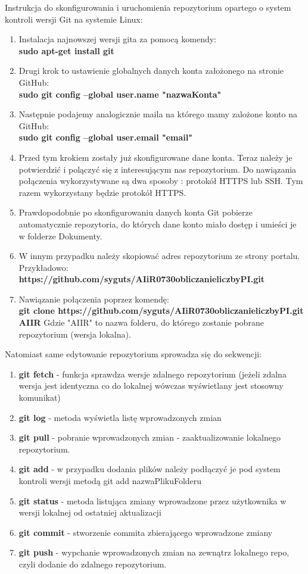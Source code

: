 \documentclass[a4paper,12pt]{article}		%
\begin{document}
Instrukcja do skonfigurowania i uruchomienia repozytorium opartego o system kontroli wersji Git na systemie Linux:
\begin{enumerate}
\item Instalacja najnowszej wersji gita za pomocą komendy:\\
\textbf{sudo apt-get install git}
\item Drugi krok to ustawienie globalnych danych konta założonego na stronie GitHub:\\
\textbf{sudo git config --global user.name "nazwaKonta" }
\item Następnie podajemy analogicznie maila na którego mamy zalożone konto na GitHub:\\
\textbf{sudo git config --global user.email "email"}
\item Przed tym krokiem zostały już skonfigurowane dane konta.  Teraz należy je potwierdzić i polączyć się z interesującym nas repozytorium. Do nawiązania połączenia wykorzystywane są dwa sposoby : protokół HTTPS lub SSH. Tym razem wykorzystany będzie protokół HTTPS.
\item Prawdopodobnie po skonfigurowaniu danych konta Git pobierze automatycznie repozytoria, do których dane konto miało dostęp i umieści je w folderze Dokumenty.
\item W innym przypadku należy skopiować adres repozytorium ze strony portalu. Przykładowo:\\
\textbf{https://github.com/syguts/AIiR0730obliczanieliczbyPI.git}
\item Nawiązanie połączenia poprzez komendę:\\
\textbf{git clone https://github.com/syguts/AIiR0730obliczanieliczbyPI.git AIIR}
Gdzie "AIIR" to nazwa folderu, do którego zostanie pobrane repozytorium (wersja lokalna).
\end{enumerate}
Natomiast same edytowanie repozytorium sprowadza się do sekwencji:\\
\begin{enumerate}
\item \textbf{git fetch} - funkcja sprawdza wersje zdalnego repozytorium (jeżeli zdalna wersja jest identyczna co do lokalnej wówczas wyświetlany jest stosowny komunikat)
\item \textbf{git log} - metoda wyświetla listę wprowadzonych zmian
\item \textbf{git pull} - pobranie wprowadzonych zmian - zaaktualizowanie lokalnego repozytorium.
\item \textbf{git add} -  w przypadku dodania plików należy podłączyć je pod system kontroli wersji metodą git add nazwaPlikuFolderu
\item \textbf{git status} - metoda listująca zmiany wprowadzone przez użytkownika w wersji lokalnej od ostatniej aktualizacji
\item \textbf{git commit} - stworzenie commita zbierającego wprowadzone zmiany
\item \textbf{git push} - wypchanie wprowadzonych zmian na zewnątrz lokalnego repo, czyli dodanie do zdalnego repozytorium.  
\end{enumerate}
\end{document}
